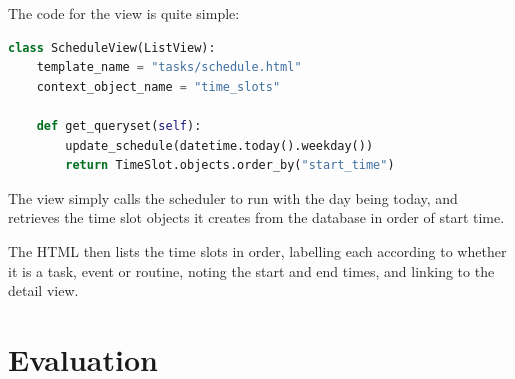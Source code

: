 \documentclass{article}
\begin{document}
The code for the view is quite simple:
\begin{lstlisting}[language=Python,breaklines]
class ScheduleView(ListView):
    template_name = "tasks/schedule.html"
    context_object_name = "time_slots"

    def get_queryset(self):
        update_schedule(datetime.today().weekday())
        return TimeSlot.objects.order_by("start_time")
\end{lstlisting}

The view simply calls the scheduler to run with the day being today,
and retrieves the time slot objects it creates from the database in order of start time.

The HTML then lists the time slots in order,
labelling each according to whether it is a task, event or routine,
noting the start and end times,
and linking to the detail view.

\part{Evaluation}
\end{document}
